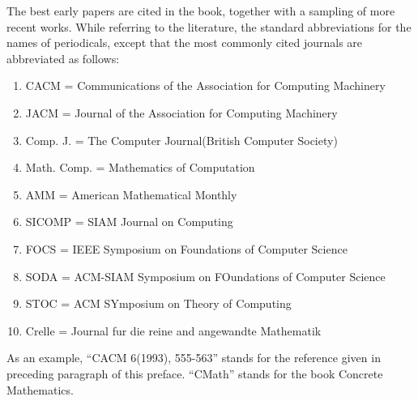 \documentclass{article}
\begin{document}
The best early papers are cited in the book, together with a sampling of more recent works. While referring to the literature, the standard abbreviations for the names of periodicals, except that the most commonly cited journals are abbreviated as follows:
\begin{enumerate}
    \item[] CACM = Communications of the Association for Computing Machinery 
    \item[] JACM = Journal of the Association for Computing Machinery 
    \item[] Comp. J. = The Computer Journal(British Computer Society)
    \item[] Math. Comp. = Mathematics of Computation 
    \item[] AMM = American Mathematical Monthly 
    \item[] SICOMP = SIAM Journal on Computing
    \item[] FOCS = IEEE Symposium on Foundations of Computer Science
    \item[] SODA = ACM-SIAM Symposium on FOundations of Computer Science
    \item[] STOC = ACM SYmposium on Theory of Computing
    \item[] Crelle =  Journal fur die reine and angewandte Mathematik
\end{enumerate}

As an example, ``CACM 6(1993), 555-563'' stands for the reference given in preceding paragraph of this preface. ``CMath'' stands for the book Concrete Mathematics.
\newpage
\end{document}
